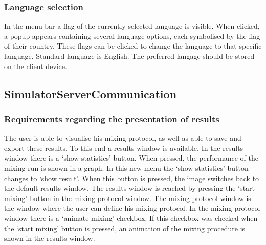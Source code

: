 
\subsubsection{Language selection}
In the menu bar a flag of the currently selected language is visible. When clicked, a popup appears containing several language options, each symbolised by the flag of their country. These flags can be clicked to change the language to that specific language. Standard language is English. The preferred langage should be stored on the client device.


\subsection{SimulatorServerCommunication}

\subsubsection{Requirements regarding the presentation of results}
The user is able to visualise his mixing protocol, as well as able to save and export these results. To this end a results window is available. In the results window there is a `show statistics' button. When pressed, the performance of the mixing run is shown in a graph. In this new menu the `show statistics' button changes to `show result'. When this button is pressed, the image switches back to the default results window. The results window is reached by pressing the `start mixing' button in the mixing protocol window. The mixing protocol window is the window where the user can define his mixing protocol. In the mixing protocol window there is a `animate mixing' checkbox. If this checkbox was checked when the `start mixing' button is pressed, an animation of the mixing procedure is shown in the results window.




